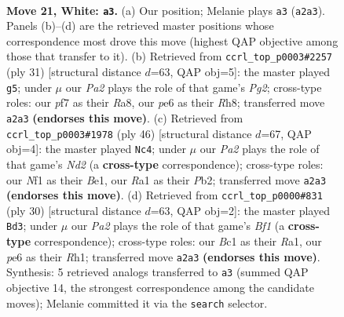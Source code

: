 \documentclass[11pt]{article}
\begin{document}
\clearpage

\begin{figure}[p]\centering
\begin{subfigure}{0.46\textwidth}\centering
\resizebox{\linewidth}{!}{%
\newchessgame
\chessboard[
  setfen={r1b1kb1r/5p2/4p3/p3n1P1/1p1p3p/8/PPK3PP/R1B2NNR w kq - 0 21},
  showmover=false,
  pgfstyle=straightmove, color=movearrow, markmove={a2-a3}
]}
\caption{}
\end{subfigure}\hfill
\begin{subfigure}{0.46\textwidth}\centering
\resizebox{\linewidth}{!}{%
\newchessgame
\chessboard[
  setfen={r6r/pp1bkppp/4p3/2npP2P/3N1P2/8/PPP2KP1/R4B1R b - - 2 16},
  showmover=false,
  pgfstyle=straightmove, color=movearrow, markmove={g7-g5}
]}
\caption{}
\end{subfigure}
\\[4pt]
\begin{subfigure}{0.46\textwidth}\centering
\resizebox{\linewidth}{!}{%
\newchessgame
\chessboard[
  setfen={r3r3/pn3kp1/1p3b1p/2p1p3/P5P1/4P3/1PRN1P1P/1R2BK2 w - - 4 24},
  showmover=false,
  pgfstyle=straightmove, color=movearrow, markmove={d2-c4}
]}
\caption{}
\end{subfigure}\hfill
\begin{subfigure}{0.46\textwidth}\centering
\resizebox{\linewidth}{!}{%
\newchessgame
\chessboard[
  setfen={r6r/pp1bkppp/4p3/2npP2P/3N1P2/8/PPP3P1/R3KB1R w KQ - 1 16},
  showmover=false,
  pgfstyle=straightmove, color=movearrow, markmove={f1-d3}
]}
\caption{}
\end{subfigure}
\caption{\textbf{Move 21, White: \texttt{a3}.} (a) Our position; Melanie plays \texttt{a3} (\texttt{a2a3}). Panels (b)--(d) are the retrieved master positions whose correspondence most drove this move (highest QAP objective among those that transfer to it). (b) Retrieved from \texttt{ccrl\_top\_p0003\#2257} (ply 31) [structural distance $d$=63, QAP obj=5]: the master played \texttt{g5}; under $\mu$ our \emph{Pa2} plays the role of that game's \emph{Pg2}; cross-type roles: our \emph{p}f7 as their \emph{R}a8, our \emph{p}e6 as their \emph{R}h8; transferred move \texttt{a2a3} \textbf{(endorses this move)}. (c) Retrieved from \texttt{ccrl\_top\_p0003\#1978} (ply 46) [structural distance $d$=67, QAP obj=4]: the master played \texttt{Nc4}; under $\mu$ our \emph{Pa2} plays the role of that game's \emph{Nd2} (a \textbf{cross-type} correspondence); cross-type roles: our \emph{N}f1 as their \emph{B}e1, our \emph{R}a1 as their \emph{P}b2; transferred move \texttt{a2a3} \textbf{(endorses this move)}. (d) Retrieved from \texttt{ccrl\_top\_p0000\#831} (ply 30) [structural distance $d$=63, QAP obj=2]: the master played \texttt{Bd3}; under $\mu$ our \emph{Pa2} plays the role of that game's \emph{Bf1} (a \textbf{cross-type} correspondence); cross-type roles: our \emph{B}c1 as their \emph{R}a1, our \emph{p}e6 as their \emph{R}h1; transferred move \texttt{a2a3} \textbf{(endorses this move)}. Synthesis: 5 retrieved analogs transferred to \texttt{a3} (summed QAP objective 14, the strongest correspondence among the candidate moves); Melanie committed it via the \texttt{search} selector.}
\label{fig:thought-m40}
\end{figure}
\end{document}
